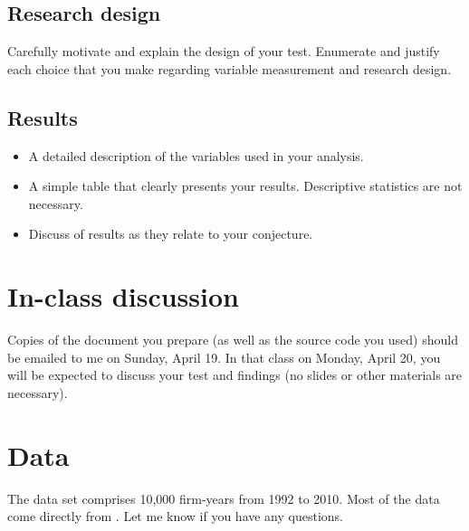 \documentclass[11pt]{amsart}
\theoremstyle{definition}
\theoremstyle{question}
\begin{document}
\subsection{Research design}
Carefully motivate and explain the design of your test. 
Enumerate and justify each choice that you make regarding  variable measurement and research design. 

\subsection{Results}
\begin{itemize}
    \item A detailed description of the variables used in your analysis. 
    \item A simple table that clearly presents your results. Descriptive statistics are not necessary.
    \item Discuss of results as they relate to your conjecture.
\end{itemize}

\section{In-class discussion}
Copies of the document you prepare (as well as the source code you used) should be emailed to me on Sunday, April 19.
In that class on Monday, April 20, you will be expected to discuss your test and findings (no slides or other materials are necessary).     

\section{Data}
The data set comprises 10,000 firm-years from 1992 to 2010. 
Most of the data come directly from \citet{Armstrong:2013hs}. 
Let me know if you have any questions.
\end{document}
